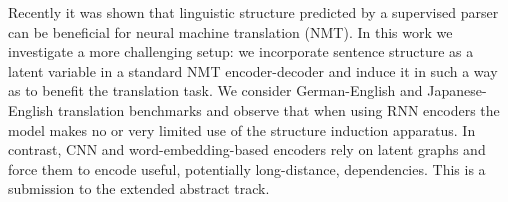 Recently it was shown that linguistic structure predicted by a supervised parser can be beneficial for neural machine translation (NMT). In this work we investigate a more challenging setup: we incorporate sentence structure as a latent variable in a standard NMT encoder-decoder and induce it in such a way as to benefit the translation task. We consider German-English and Japanese-English translation benchmarks and observe that when using RNN encoders the model makes no or very limited use of the structure induction apparatus. In contrast, CNN and word-embedding-based encoders rely on latent graphs and force them to encode useful, potentially long-distance, dependencies. This is a submission to the extended abstract track.
